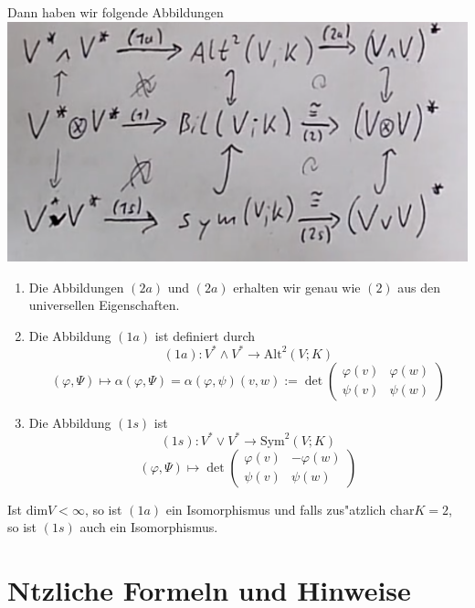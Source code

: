 \documentclass[11pt, a4paper]{article}
\begin{document}
Dann haben wir folgende Abbildungen 
\\
\includegraphics[scale=0.4]{Diagramm}
\\
\begin{enumerate}
\item Die Abbildungen $(2a)$ und $(2a)$ erhalten wir genau wie $(2)$ aus den universellen Eigenschaften.
\item Die Abbildung $(1a)$ ist definiert durch 
$$
(1a): V^* \wedge V^* \rightarrow \mathrm{Alt}^2(V;K)
$$
$$
(\varphi, \Psi) \mapsto \alpha (\varphi, \Psi) = 
\alpha(\varphi, \psi)(v, w):=\operatorname{det}\left(\begin{array}{cc}\varphi(v) & \varphi(w) \\ \psi(v) & \psi(w)\end{array}\right)
$$
\item Die Abbildung $(1s)$ ist
$$
(1s): V^* \vee V^* \rightarrow \mathrm{Sym}^2 (V;K)
$$
$$
(\varphi, \Psi) \mapsto \operatorname{det}\left(\begin{array}{cc}\varphi(v) & - \varphi(w) \\ \psi(v) & \psi(w)\end{array}\right)
$$
\end{enumerate}

\begin{theorem}
Ist $\mathrm{dim}V < \infty$, so ist $(1a)$ ein Isomorphismus und falls zus"atzlich $\mathrm{char}K = 2$, so ist $(1s)$ auch ein Isomorphismus.
\end{theorem}




 
\section{N\uee tzliche Formeln und Hinweise}
\end{document}
